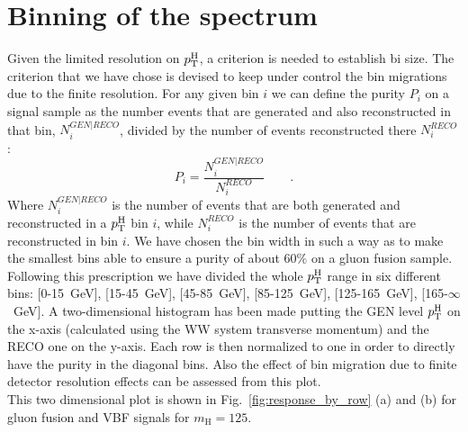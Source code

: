 \section{Binning of the \pth spectrum}
\label{sec:Binning}

Given the limited resolution on $p_\mathrm{T}^\mathrm{H}$, a criterion is needed to establish bi size. The criterion that we have chose is devised to keep under control the bin migrations due to the finite resolution. 
For any given bin $i$ we can define the purity $P_i$ on a signal sample as the number events that are generated and also reconstructed in that bin, $N_i^{GEN|RECO}$, divided by the number of events reconstructed there $N_i^{RECO}$:
\begin{equation}
P_i = \frac{N_i^{GEN|RECO}}{N_i^{RECO}} \qquad .
\end{equation}
Where $N_i^{GEN|RECO}$ is the number of events that are both generated and
reconstructed in a $p_\mathrm{T}^\mathrm{H}$ bin $i$, while $N_i^{RECO}$ is the number of events
that are reconstructed in bin $i$. We have chosen the bin width in such a way
as to make the smallest bins able to ensure a purity of about 60\% on a gluon fusion sample.
Following this prescription we have divided the whole $p_\mathrm{T}^\mathrm{H}$ range in six
different bins: \mbox{[0-15 GeV]}, \mbox{[15-45 GeV]}, \mbox{[45-85 GeV]},
\mbox{[85-125 GeV]}, \mbox{[125-165 GeV]}, \mbox{[165-$\infty$ GeV]}.
A two-dimensional histogram  has been made putting the GEN level $p_\mathrm{T}^\mathrm{H}$ on the x-axis (calculated using the WW system transverse momentum) and the RECO one on the y-axis. Each row is then normalized to one in order to directly have the purity in the diagonal bins. Also the effect of bin migration due to finite detector resolution effects can be assessed from this plot.\\
This two dimensional plot is shown in Fig.~\ref{fig:response_by_row} (a) and (b) for gluon fusion and VBF signals for $m_\mathrm{H}=125$\GeV.
